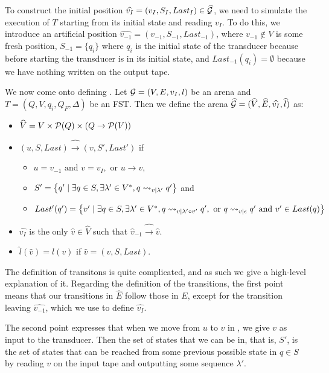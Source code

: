 \documentclass[10pt, a4paper]{report}
\begin{document}
To construct the initial position $\widehat{v_I} = (v_I, S_I, Last_I) \in
\widehat{\mathcal{G}}$, we need to simulate the execution of $T$ starting from its
initial state and reading $v_I$. To do this, we introduce an artificial position
$\widehat{v_{-1}} = (v_{-1}, S_{-1}, Last_{-1})$, where $v_{-1} \not \in V$ is
some fresh position, $S_{-1} = \{q_i\}$ where $q_i$ is the initial state of the
transducer because before starting the transducer is in its initial state, and
$Last_{-1} (q_i) = \emptyset$ because we have nothing written on the output
tape.  

\bigskip

We now come onto defining . Let $\mathcal{G} = (V, E, v_I, l)$ be an arena and
$T = (Q, V, q_i, Q_F, \Delta)$ be an FST. Then we define the arena
$\widehat{\mathcal{G}} = (\widehat{V}, \widehat{E}, \widehat{v_I}, \widehat{l})$ as:

\begin{itemize}
\item $\widehat{V} = V \times \mathcal{P}(Q) \times (Q \rightarrow \mathcal{P}(V))$
\item $(u, S, Last) \widehat{\rightarrow} (v, S', Last')$ if
  \begin{itemize}
  \item $u = v_{-1} \text{ and } v = v_I, \text{ or } u \rightarrow v$,
  \item $S' = \left\{q' \mid \exists q \in S, \exists \lambda' \in V^\ast, q
      \rightsquigarrow_{v \mid \lambda'} q' \right\}$ and
  \item $Last' (q') = \left\{ v' \mid \exists q \in S, \exists \lambda' \in
      V^\ast, q \rightsquigarrow_{v \mid \lambda' \circ v'} q', \text{ or } q \rightsquigarrow_{v \mid
        \epsilon} q' \text{ and } v' \in Last(q) \right\}$
  \end{itemize}
\item $\widehat{v_I}$ is the only $\widehat{v} \in \widehat{V}$ such that
  $\widehat{v}_{-1} \widehat{\rightarrow} \widehat{v}$.
\item $\widehat{l}(\widehat{v}) = l (v)$ if $\widehat{v}= (v, S, Last)$. 
\end{itemize}

The definition of transitons is quite complicated, and as such we give a high-level
explanation of it. Regarding the definition of the transitions,
the first point means that our transitions in $\widehat{E}$ follow those in $E$,
except for the transition leaving $\widehat{v_{-1}}$, which we use to define
$\widehat{v_I}$. 

The second point expresses that when we move from $u$ to $v$ in , we give
$v$ as input to the transducer. Then the set of states that we can be in, that
is, $S'$, is the set of states that can be reached from some previous possible
state in $q \in S$ by reading $v$ on the input tape and outputting some sequence
$\lambda'$.
\end{document}
